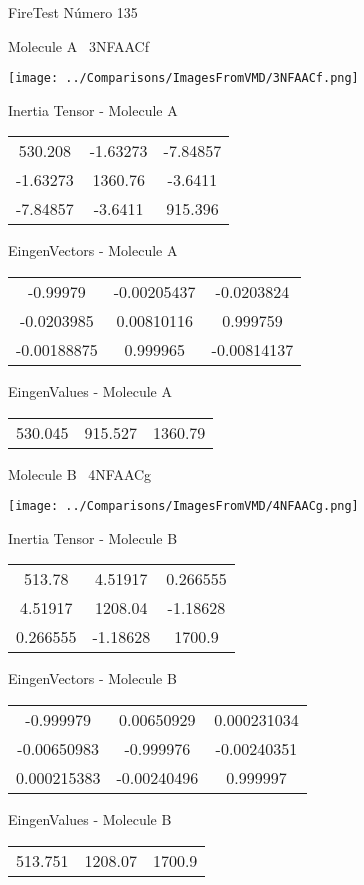\vtab[-3cm]
\begin{center}
{\large FireTest \tab Número 135}
\end{center}
\begin{multicols}{2}
\begin{center}

Molecule A \
3NFAACf

\texttt{[image: ../Comparisons/ImagesFromVMD/3NFAACf.png]}

Inertia Tensor - Molecule A \\
\begin{tabular}{|c c c|}
530.208	 & 	-1.63273	 & 	-7.84857	 \\
-1.63273	 & 	1360.76	 & 	-3.6411	 \\
-7.84857	 & 	-3.6411	 & 	915.396
\end{tabular}

\vtab
 EingenVectors - Molecule A     \\
\begin{tabular}{|c c c|}
-0.99979	 & 	-0.00205437	 & 	-0.0203824	 \\
-0.0203985	 & 	0.00810116	 & 	0.999759	 \\
-0.00188875	 & 	0.999965	 & 	-0.00814137
\end{tabular}

\vtab
 EingenValues - Molecule A     \\
\begin{tabular}{|c c c|}
530.045	 & 	915.527	 & 	1360.79	 \\
\end{tabular}
\columnbreak

Molecule B \
4NFAACg

\texttt{[image: ../Comparisons/ImagesFromVMD/4NFAACg.png]}

Inertia Tensor - Molecule B \\
\begin{tabular}{|c c c|}
513.78	 & 	4.51917	 & 	0.266555	 \\
4.51917	 & 	1208.04	 & 	-1.18628	 \\
0.266555	 & 	-1.18628	 & 	1700.9
\end{tabular}

\vtab
 EingenVectors - Molecule B     \\
\begin{tabular}{|c c c|}
-0.999979	 & 	0.00650929	 & 	0.000231034	 \\
-0.00650983	 & 	-0.999976	 & 	-0.00240351	 \\
0.000215383	 & 	-0.00240496	 & 	0.999997
\end{tabular}

\vtab
 EingenValues - Molecule B     \\
\begin{tabular}{|c c c|}
513.751	 & 	1208.07	 & 	1700.9	 \\
\end{tabular}

\end{center}
\end{multicols}

